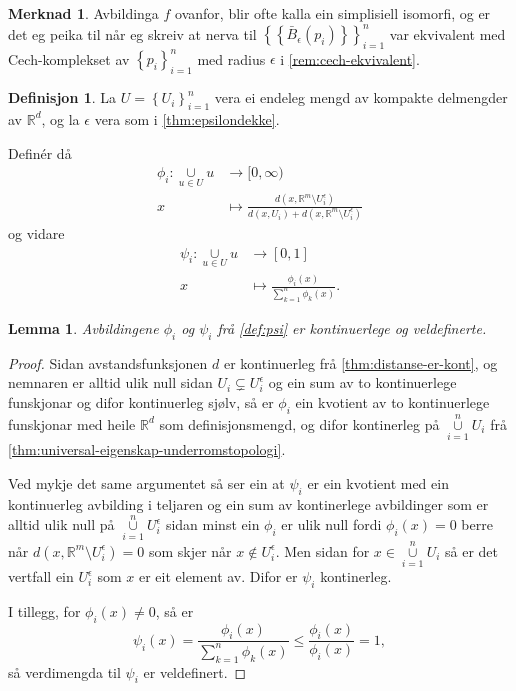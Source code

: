 \documentclass[a4paper, 12pt, norsk]{article}
\theoremstyle{plain}
\newtheorem{lemma}[theorem]{Lemma}
\theoremstyle{definition}
\newtheorem{definition}[theorem]{Definisjon}
\newtheorem{remark}[theorem]{Merknad}
\newcommand{\Rb}{\mathbb{R}}
\newcommand{\union}{ \mathop{\cup}\limits }
\newcommand{\set}[1]{ \left\{ #1 \right\} } %
\begin{document}
\begin{remark}
	Avbildinga \( f \) ovanfor, blir ofte kalla ein simplisiell isomorfi, og er det eg peika til når eg skreiv at nerva til \( \set{\set{\bar{B}_\epsilon(p_i)}}_{i=1}^n \) var ekvivalent med Cech-komplekset av \( \set{p_i}_{i=1}^n \) med radius \( \epsilon \) i \autoref{rem:cech-ekvivalent}.
\end{remark}

\begin{definition} \label{def:psi}
	La \( U = \set{U_i}_{i=1}^n \) vera ei endeleg mengd av kompakte delmengder av \( \Rb^d \), og la \( \epsilon \) vera som i \autoref{thm:epsilondekke}.

	Definér då
	\begin{align*}
		\phi_i : \union_{u \in U} u &\to [0, \infty) \\
		x &\mapsto \frac{d(x, \Rb^m \setminus U_i^\epsilon)}{d(x, U_i) + d(x, \Rb^m \setminus U_i^\epsilon)}
	\end{align*}
	og vidare
	\begin{align*}
		\psi_i : \union_{u \in U} u &\to [0, 1] \\
		x &\mapsto \frac{\phi_i(x)}{\sum_{k=1}^n \phi_k(x)}.
	\end{align*}
\end{definition}

\begin{lemma}
	Avbildingene \( \phi_i \) og \( \psi_i \) frå \autoref{def:psi} er kontinuerlege og veldefinerte.
\end{lemma}

\begin{proof} 
	Sidan avstandsfunksjonen \( d \) er kontinuerleg frå \autoref{thm:distanse-er-kont}, og nemnaren er alltid ulik null sidan \( U_i \subsetneq U_i^\epsilon \) og ein sum av to kontinuerlege funskjonar og difor kontinuerleg sjølv, så er \( \phi_i \) ein kvotient av to kontinuerlege funskjonar med heile \( \Rb^d \) som definisjonsmengd, og difor kontinerleg på \( \union_{i=1}^n U_i \) frå \autoref{thm:universal-eigenskap-underromstopologi}.

	Ved mykje det same argumentet så ser ein at \( \psi_i \) er ein kvotient med ein kontinuerleg avbilding i teljaren og ein sum av kontinerlege avbildinger som er alltid ulik null på \( \union_{i=1}^n U_i^\epsilon \) sidan minst ein \( \phi_i \) er ulik null fordi \( \phi_i(x)=0 \) berre når \( d(x, \Rb^m \setminus U_i^\epsilon)=0 \) som skjer når \( x \not\in U_i^\epsilon \). Men sidan for \( x \in \union_{i=1}^n U_i \) så er det vertfall ein \( U_i^\epsilon \) som \( x \) er eit element av. Difor er \( \psi_i \) kontinerleg.

	I tillegg, for \( \phi_i(x) \neq 0 \), så er
	\[
		\psi_i(x) = \frac{\phi_i(x)}{\sum_{k=1}^n \phi_k(x)} \leq \frac{\phi_i(x)}{\phi_i(x)} = 1,
	\]
	så verdimengda til \( \psi_i \) er veldefinert.
\end{proof}
\end{document}
